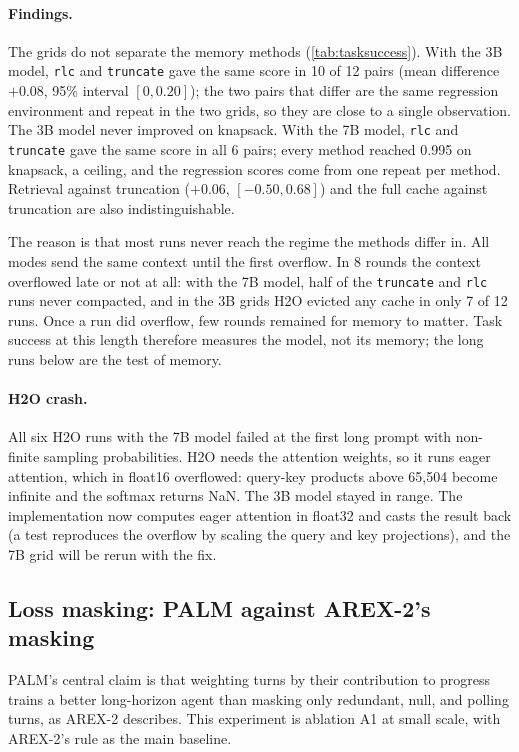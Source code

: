 \documentclass[11pt]{article}
\newcommand{\code}[1]{\texttt{#1}}
\begin{document}
\paragraph{Findings.} The grids do not separate the memory methods (\cref{tab:tasksuccess}). With the 3B model, \code{rlc} and \code{truncate} gave the same score in 10 of 12 pairs (mean difference $+0.08$, 95\% interval $[0, 0.20]$); the two pairs that differ are the same regression environment and repeat in the two grids, so they are close to a single observation. The 3B model never improved on knapsack. With the 7B model, \code{rlc} and \code{truncate} gave the same score in all 6 pairs; every method reached 0.995 on knapsack, a ceiling, and the regression scores come from one repeat per method. Retrieval against truncation ($+0.06$, $[-0.50, 0.68]$) and the full cache against truncation are also indistinguishable.

The reason is that most runs never reach the regime the methods differ in. All modes send the same context until the first overflow. In 8 rounds the context overflowed late or not at all: with the 7B model, half of the \code{truncate} and \code{rlc} runs never compacted, and in the 3B grids H2O evicted any cache in only 7 of 12 runs. Once a run did overflow, few rounds remained for memory to matter. Task success at this length therefore measures the model, not its memory; the long runs below are the test of memory.

\paragraph{H2O crash.} All six H2O runs with the 7B model failed at the first long prompt with non-finite sampling probabilities. H2O needs the attention weights, so it runs eager attention, which in float16 overflowed: query-key products above 65,504 become infinite and the softmax returns NaN. The 3B model stayed in range. The implementation now computes eager attention in float32 and casts the result back (a test reproduces the overflow by scaling the query and key projections), and the 7B grid will be rerun with the fix.

\subsection{Loss masking: PALM against AREX-2's masking}
\label{sec:palmexp}
PALM's central claim is that weighting turns by their contribution to progress trains a better long-horizon agent than masking only redundant, null, and polling turns, as AREX-2 describes. This experiment is ablation A1 at small scale, with AREX-2's rule as the main baseline.
\end{document}
